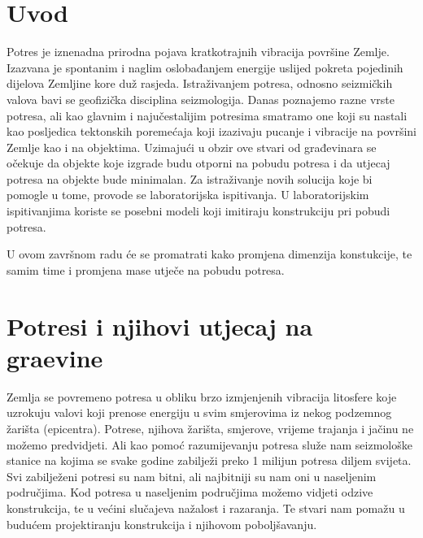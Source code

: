 \documentclass[12pt]{book}
\begin{document}


\pagestyle{empty}


\cleardoublepage
\begin{flushleft}
	
\end{flushleft}

\setcounter{page}{1}

\tableofcontents
\cleardoublepage

\listoffigures

\cleardoublepage
{}\listoftables


\clearpage

\pagestyle{plain}
\setcounter{page}{1}

\chapter{Uvod}
Potres je iznenadna prirodna pojava kratkotrajnih vibracija površine Zemlje. Izazvana je spontanim i naglim oslobađanjem energije uslijed pokreta pojedinih dijelova Zemljine kore duž rasjeda. Istraživanjem potresa, odnosno seizmičkih valova bavi se geofizička disciplina seizmologija. Danas poznajemo razne vrste potresa, ali kao glavnim i najučestalijim potresima smatramo one koji su nastali kao posljedica tektonskih poremećaja koji izazivaju pucanje i vibracije na površini Zemlje kao i na objektima. Uzimajući u obzir ove stvari od građevinara se očekuje da objekte koje izgrade budu otporni na pobudu potresa i da utjecaj potresa na objekte bude minimalan. Za istraživanje novih solucija koje bi pomogle u tome, provode se laboratorijska ispitivanja. U laboratorijskim ispitivanjima koriste se posebni modeli koji imitiraju konstrukciju pri pobudi potresa. 

U ovom završnom radu će se promatrati kako promjena dimenzija konstukcije, te samim time i promjena mase utječe na pobudu potresa.

\chapter{Potresi i njihovi utjecaj na gra\DJ evine}
Zemlja se povremeno potresa u obliku brzo izmjenjenih vibracija litosfere koje uzrokuju valovi koji prenose energiju u svim smjerovima iz nekog podzemnog žarišta (epicentra). Potrese, njihova žarišta, smjerove, vrijeme trajanja i jačinu ne možemo predvidjeti. Ali kao pomoć razumijevanju potresa služe nam seizmološke stanice na kojima se svake godine zabilježi preko 1 milijun potresa diljem svijeta. Svi zabilježeni potresi su nam bitni, ali najbitniji su nam oni u naseljenim područjima. Kod potresa u naseljenim područjima možemo vidjeti odzive konstrukcija, te u većini slučajeva nažalost i razaranja. Te stvari nam pomažu u budućem projektiranju konstrukcija i njihovom poboljšavanju.
\end{document}
